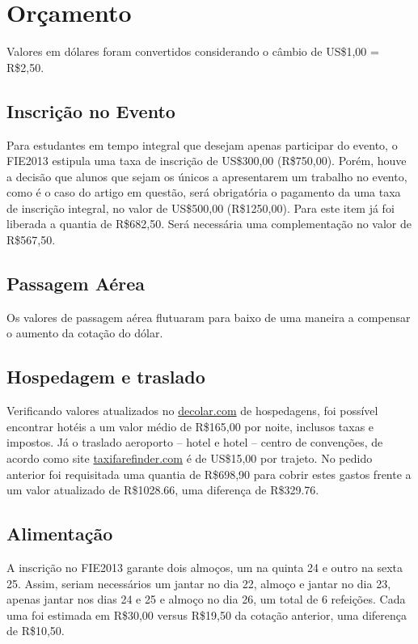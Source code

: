 \documentclass[brazil]{article}
\newcommand{\usd}{US\$}
\newcommand{\brl}{R\$}
\begin{document}
\section{Orçamento}
Valores em dólares foram convertidos considerando o câmbio de \usd1,00 = \brl2,50.

\subsection{Inscrição no Evento}
Para estudantes em tempo integral que desejam apenas participar do evento, o FIE2013 estipula uma taxa de inscrição de \usd300,00 (\brl750,00). Porém, houve a decisão que alunos que sejam os únicos a apresentarem um trabalho no evento, como é o caso do artigo em questão, será obrigatória o pagamento da uma taxa de inscrição integral, no valor de \usd500,00 (\brl1250,00). Para este item já foi liberada a quantia de \brl682,50. Será necessária uma complementação no valor de \brl567,50.

\subsection{Passagem Aérea}
Os valores de passagem aérea flutuaram para baixo de uma maneira a compensar o aumento da cotação do dólar.

\subsection{Hospedagem e traslado}
Verificando valores atualizados no \url{decolar.com} de hospedagens, foi possível encontrar hotéis a um valor médio de \brl165,00 por noite, inclusos taxas e impostos. Já o traslado aeroporto -- hotel e hotel -- centro de convenções, de acordo como site \url{taxifarefinder.com} é de \usd15,00 por trajeto. No pedido anterior foi requisitada uma quantia de \brl698,90 para cobrir estes gastos frente a um valor atualizado de \brl1028.66, uma diferença de \brl329.76.

\subsection{Alimentação}
A inscrição no FIE2013 garante dois almoços, um na quinta 24 e outro na sexta 25. Assim, seriam necessários um jantar no dia 22, almoço e jantar no dia 23, apenas jantar nos dias 24 e 25 e almoço no dia 26, um total de 6 refeições. Cada uma foi estimada em \brl30,00 versus \brl19,50 da cotação anterior, uma diferença de \brl10,50.
\end{document}
